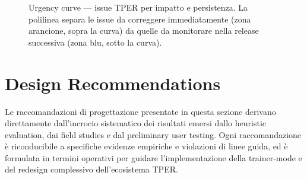 ﻿\documentclass[11pt,a4paper]{article}
\begin{document}
\begin{figure}[H]
\caption{Urgency curve --- issue TPER per impatto e persistenza.
  La polilinea separa le issue da correggere immediatamente (zona arancione,
  sopra la curva) da quelle da monitorare nella release successiva
  (zona blu, sotto la curva).}
\label{fig:urgency-curve}
\end{figure}

\newpage


\section{Design Recommendations}

\label{sec:design-recommendations}

Le raccomandazioni di progettazione presentate in questa sezione derivano
direttamente dall'incrocio sistematico dei risultati emersi dallo heuristic
evaluation, dai field studies e dal preliminary user testing. Ogni
raccomandazione è riconducibile a specifiche evidenze empiriche e violazioni
di linee guida, ed è formulata in termini operativi per guidare
l'implementazione della trainer-mode e del redesign complessivo
dell'ecosistema TPER.
\end{document}
